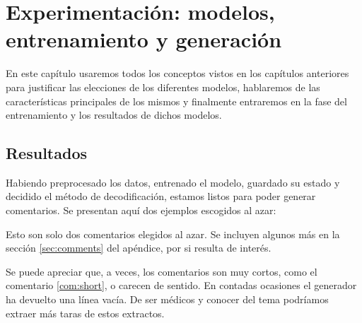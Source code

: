 \chapter{Experimentación: modelos, \\entrenamiento y generación}

En este capítulo usaremos todos los conceptos vistos en los capítulos anteriores para justificar las elecciones de los diferentes modelos, hablaremos de las características principales de los mismos y finalmente entraremos en la fase del entrenamiento y los resultados de dichos modelos.








\section{Resultados}

Habiendo preprocesado los datos, entrenado el modelo, guardado su estado y decidido el método de decodificación, estamos listos para poder generar comentarios. Se presentan aquí dos ejemplos escogidos al azar:

\begin{thm}
\end{thm}
\begin{thm}
\end{thm}

Esto son solo dos comentarios elegidos al azar. Se incluyen algunos más en la sección \ref{sec:comments} del apéndice, por si resulta de interés.

Se puede apreciar que, a veces, los comentarios son muy cortos, como el comentario \ref{com:short}, o carecen de sentido. En contadas ocasiones el generador ha devuelto una línea vacía. De ser médicos y conocer del tema podríamos extraer más taras de estos extractos. 

